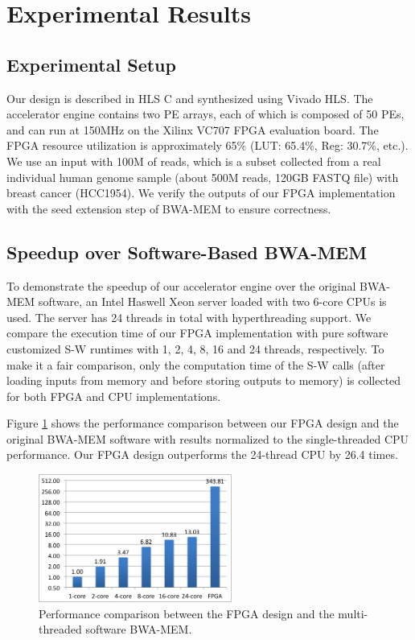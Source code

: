 \section{Experimental Results} 
\label{sec:results}
\subsection{Experimental Setup}
Our design is described in HLS C and synthesized using Vivado HLS.
The accelerator engine contains two PE arrays, each of which is composed of 50 PEs, and can run at 150MHz on the Xilinx VC707 FPGA evaluation board.
The FPGA resource utilization is approximately 65\% (LUT: 65.4\%, Reg: 30.7\%, etc.). 
We use an input with 100M of reads, which is a subset collected from a real individual human genome sample (about 500M reads, 120GB FASTQ file) with breast cancer (HCC1954). 
We verify the outputs of our FPGA implementation with the seed extension step of BWA-MEM to ensure correctness. 
\subsection{Speedup over Software-Based BWA-MEM}
To demonstrate the speedup of our accelerator engine over the original BWA-MEM software, 
an Intel Haswell Xeon server loaded with two 6-core CPUs is used.
The server has 24 threads in total with hyperthreading support.
We compare the execution time of our FPGA implementation with pure software customized S-W runtimes with 1, 2, 4, 8, 16 and 24 threads, respectively.
To make it a fair comparison, only the computation time of the S-W calls (after loading inputs from memory and before storing outputs to memory) is collected for both FPGA and CPU implementations.

Figure \ref{fig:F1C5} shows the performance comparison between our FPGA design and the original BWA-MEM software with results normalized to the single-threaded CPU performance.
Our FPGA design outperforms the 24-thread CPU by 26.4 times.
\begin{figure}[!hbt]
	\begin{center}
		\includegraphics[width=2.5in]{Figures/F1C5.jpg}
		\caption {Performance comparison between the FPGA design and the multi-threaded software BWA-MEM.}
		\label{fig:F1C5}
	\end{center}
\end{figure}
